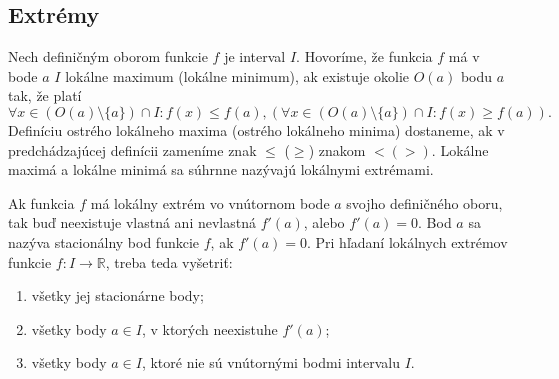 \subsection{Extrémy}
Nech definičným oborom funkcie $f$ je interval $I$. Hovoríme, že funkcia $f$ má v bode $a$ $I$ lokálne maximum (lokálne minimum), ak existuje okolie $O(a)$ bodu $a$ tak, že platí 
$$\forall x\in (O(a)\setminus \{a\})\cap I:f(x)\leq f(a),(\forall x\in (O(a)\setminus \{a\})\cap I:f(x)\geq f(a)).$$
Definíciu ostrého lokálneho maxima (ostrého lokálneho minima) dostaneme, ak v predchádzajúcej definícii zameníme znak $\leq$ ($\geq$) znakom $<(>)$. Lokálne maximá a lokálne minimá sa súhrnne nazývajú lokálnymi extrémami.

\begin{veta}
Ak funkcia $f$ má lokálny extrém vo vnútornom bode $a$ svojho definičného oboru, tak buď neexistuje vlastná ani nevlastná $f'(a)$, alebo $f'(a)=0$.
Bod $a$ sa nazýva stacionálny bod funkcie $f$, ak $f'(a)=0$.
Pri hľadaní lokálnych extrémov funkcie $f:I\rightarrow\mathbb{R}$, treba teda vyšetriť:
\begin{enumerate}
\item všetky jej stacionárne body;
\item všetky body $a\in I$, v ktorých neexistuhe $f'(a)$;
\item všetky body $a\in I$, ktoré nie sú vnútornými bodmi intervalu $I$.
\end{enumerate}
\end{veta}